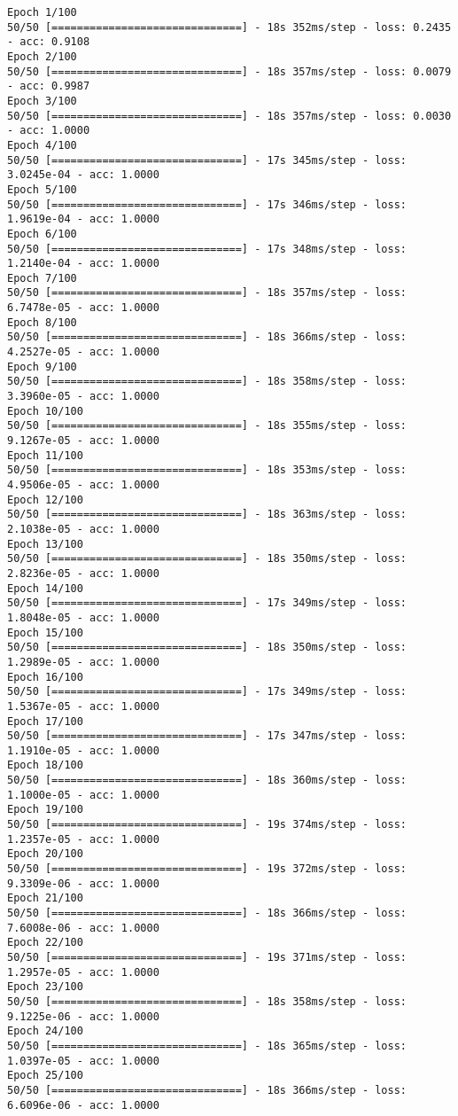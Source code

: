 \documentclass[11pt]{article}
\begin{document}
    \begin{Verbatim}[commandchars=\\\{\}]
Epoch 1/100
50/50 [==============================] - 18s 352ms/step - loss: 0.2435 - acc: 0.9108
Epoch 2/100
50/50 [==============================] - 18s 357ms/step - loss: 0.0079 - acc: 0.9987
Epoch 3/100
50/50 [==============================] - 18s 357ms/step - loss: 0.0030 - acc: 1.0000
Epoch 4/100
50/50 [==============================] - 17s 345ms/step - loss: 3.0245e-04 - acc: 1.0000
Epoch 5/100
50/50 [==============================] - 17s 346ms/step - loss: 1.9619e-04 - acc: 1.0000
Epoch 6/100
50/50 [==============================] - 17s 348ms/step - loss: 1.2140e-04 - acc: 1.0000
Epoch 7/100
50/50 [==============================] - 18s 357ms/step - loss: 6.7478e-05 - acc: 1.0000
Epoch 8/100
50/50 [==============================] - 18s 366ms/step - loss: 4.2527e-05 - acc: 1.0000
Epoch 9/100
50/50 [==============================] - 18s 358ms/step - loss: 3.3960e-05 - acc: 1.0000
Epoch 10/100
50/50 [==============================] - 18s 355ms/step - loss: 9.1267e-05 - acc: 1.0000
Epoch 11/100
50/50 [==============================] - 18s 353ms/step - loss: 4.9506e-05 - acc: 1.0000
Epoch 12/100
50/50 [==============================] - 18s 363ms/step - loss: 2.1038e-05 - acc: 1.0000
Epoch 13/100
50/50 [==============================] - 18s 350ms/step - loss: 2.8236e-05 - acc: 1.0000
Epoch 14/100
50/50 [==============================] - 17s 349ms/step - loss: 1.8048e-05 - acc: 1.0000
Epoch 15/100
50/50 [==============================] - 18s 350ms/step - loss: 1.2989e-05 - acc: 1.0000
Epoch 16/100
50/50 [==============================] - 17s 349ms/step - loss: 1.5367e-05 - acc: 1.0000
Epoch 17/100
50/50 [==============================] - 17s 347ms/step - loss: 1.1910e-05 - acc: 1.0000
Epoch 18/100
50/50 [==============================] - 18s 360ms/step - loss: 1.1000e-05 - acc: 1.0000
Epoch 19/100
50/50 [==============================] - 19s 374ms/step - loss: 1.2357e-05 - acc: 1.0000
Epoch 20/100
50/50 [==============================] - 19s 372ms/step - loss: 9.3309e-06 - acc: 1.0000
Epoch 21/100
50/50 [==============================] - 18s 366ms/step - loss: 7.6008e-06 - acc: 1.0000
Epoch 22/100
50/50 [==============================] - 19s 371ms/step - loss: 1.2957e-05 - acc: 1.0000
Epoch 23/100
50/50 [==============================] - 18s 358ms/step - loss: 9.1225e-06 - acc: 1.0000
Epoch 24/100
50/50 [==============================] - 18s 365ms/step - loss: 1.0397e-05 - acc: 1.0000
Epoch 25/100
50/50 [==============================] - 18s 366ms/step - loss: 6.6096e-06 - acc: 1.0000

\end{Verbatim}
\end{document}
